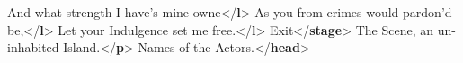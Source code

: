 \begin{shaded}
\hspace*{1em}\hspace*{1em}\hspace*{1em}And what strength I have's mine owne{</\textbf{l}>}\mbox{}\newline 
\hspace*{1em}\hspace*{1em}\hspace*{1em}As you from crimes would pardon'd be,{</\textbf{l}>}\mbox{}\newline 
\hspace*{1em}\hspace*{1em}\hspace*{1em}Let your Indulgence set me free.{</\textbf{l}>}\mbox{}\newline 
\hspace*{1em}\hspace*{1em}\mbox{}\newline 
\hspace*{1em}\hspace*{1em}Exit{</\textbf{stage}>}\mbox{}\newline 
\hspace*{1em}\mbox{}\newline 
\hspace*{1em}\mbox{}\newline 
\hspace*{1em}\hspace*{1em}The Scene, an un-inhabited Island.{</\textbf{p}>}\mbox{}\newline 
\hspace*{1em}\mbox{}\newline 
\hspace*{1em}\mbox{}\newline 
\hspace*{1em}\hspace*{1em}Names of the Actors.{</\textbf{head}>}\mbox{}\newline 

\end{shaded}
